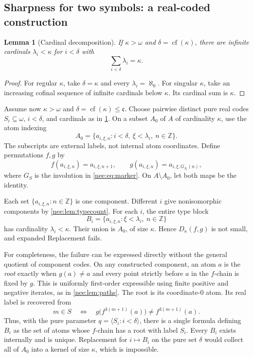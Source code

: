\documentclass[11pt,letterpaper]{article}
\numberwithin{equation}{section}
\theoremstyle{plain}
\newtheorem{lemma}[lemma]{Lemma}
\theoremstyle{definition}
\theoremstyle{remark}
\newcommand{\cf}{\operatorname{cf}}
\newcommand{\cont}{\mathfrak c}
\begin{document}
\subsection{Sharpness for two symbols: a real-coded construction}
\begin{lemma}[Cardinal decomposition]\label{nee:lem:decomp}
If $\kappa>\omega$ and $\delta=\cf(\kappa)$, there are infinite cardinals $\lambda_i<\kappa$ for $i<\delta$ with
\[
\sum_{i<\delta}\lambda_i=\kappa.
\]
\end{lemma}
\begin{proof}
For regular $\kappa$, take $\delta=\kappa$ and every $\lambda_i=\aleph_0$. For singular $\kappa$, take an increasing cofinal sequence of infinite cardinals below $\kappa$. Its cardinal sum is $\kappa$.
\end{proof}

Assume now $\kappa>\omega$ and $\delta=\cf(\kappa)\leq\cont$. Choose pairwise distinct pure real codes $S_i\subseteq\omega$, $i<\delta$, and cardinals as in \cref{nee:lem:decomp}. On a subset $A_0$ of $A$ of cardinality $\kappa$, use the atom indexing
\begin{equation}\label{nee:eq:atomsreal}
A_0=\{a_{i,\xi,n}:i<\delta,\ \xi<\lambda_i,\ n\in\mathbb Z\}.
\end{equation}
The subscripts are external labels, not internal atom coordinates. Define permutations $f,g$ by
\[
f(a_{i,\xi,n})=a_{i,\xi,n+1},\qquad
g(a_{i,\xi,n})=a_{i,\xi,G_{S_i}(n)},
\]
where $G_S$ is the involution in \eqref{nee:eq:marker}. On $A\setminus A_0$, let both maps be the identity.

Each set $\{a_{i,\xi,n}:n\in\mathbb Z\}$ is one component. Different $i$ give nonisomorphic components by \cref{nee:lem:typecount}. For each $i$, the entire type block
\[
B_i=\{a_{i,\xi,n}:\xi<\lambda_i,\ n\in\mathbb Z\}
\]
has cardinality $\lambda_i<\kappa$. Their union is $A_0$, of size $\kappa$. Hence $D_\kappa(f,g)$ is not small, and expanded Replacement fails.

For completeness, the failure can be expressed directly without the general quotient of component codes. On any constructed component, an atom $a$ is the \emph{root} exactly when $g(a)\neq a$ and every point strictly before $a$ in the $f$-chain is fixed by $g$. This is uniformly first-order expressible using finite positive and negative iterates, as in \cref{nee:lem:paths}. The root is its coordinate-$0$ atom. Its real label is recovered from
\begin{equation}\label{nee:eq:readcode}
m\in S\quad\Longleftrightarrow\quad
 g\bigl(f^{3(m+1)}(a)\bigr)\neq f^{3(m+1)}(a).
\end{equation}
Thus, with the pure parameter $q=\langle S_i:i<\delta\rangle$, there is a single formula defining $B_i$ as the set of atoms whose $f$-chain has a root with label $S_i$. Every $B_i$ exists internally and is unique. Replacement for $i\mapsto B_i$ on the pure set $\delta$ would collect all of $A_0$ into a kernel of size $\kappa$, which is impossible.
\end{document}
